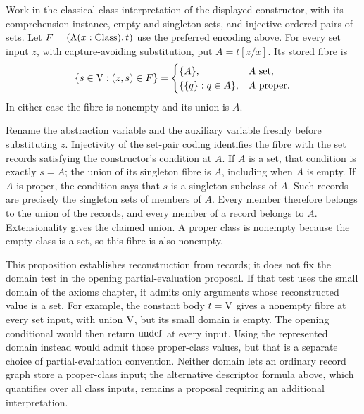 \begin{proposition}
Work in the classical class interpretation of the displayed constructor,
with its comprehension instance, empty and singleton sets, and injective
ordered pairs of sets.
Let $F=(\Lambda (x:{\text{Class}}),t)$ use the preferred encoding above.
For every set input $z$, with capture-avoiding substitution, put
$A=t[z/x]$. Its stored fibre is
\[
\{s\in\mathrm{V}:(z,s)\in F\}=
\begin{cases}
\{A\},&A\mathrm{\ set},\\
\{\{q\}:q\in A\},&A{\text{ proper}}.
\end{cases}
\]
In either case the fibre is nonempty and its union is $A$.
\end{proposition}
\Proof
Rename the abstraction variable and the auxiliary variable freshly before
substituting $z$. Injectivity of the set-pair coding identifies the fibre
with the set records satisfying the constructor's condition at $A$.
If $A$ is a set, that condition is exactly $s=A$; the union of its
singleton fibre is $A$, including when $A$ is empty.
If $A$ is proper, the condition says that $s$ is a singleton subclass
of $A$. Such records are precisely the singleton sets of members of
$A$. Every member therefore belongs to the union of the records, and
every member of a record belongs to $A$. Extensionality gives the
claimed union. A proper class is nonempty because the empty class is
a set, so this fibre is also nonempty.
\Done

This proposition establishes reconstruction from records; it does not
fix the domain test in the opening partial-evaluation proposal. If that
test uses the small domain of the axioms chapter, it admits only arguments
whose reconstructed value is a set. For example, the constant body $t=\mathrm{V}$ gives a nonempty fibre at
every set input, with union $\mathrm{V}$, but its small domain is empty. The
opening conditional would then return $\mathrm{undef}$ at every input.
Using the represented domain instead would admit those proper-class
values, but that is a separate choice of partial-evaluation convention.
Neither domain lets an ordinary record graph store a proper-class input;
the alternative descriptor formula above, which quantifies over all
class inputs, remains a proposal requiring an additional interpretation.

